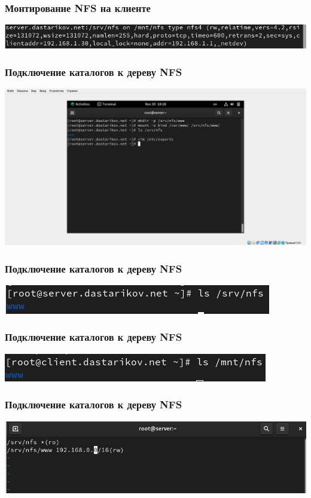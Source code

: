 \begin{frame}
\frametitle{Монтирование NFS на клиенте}
    \includegraphics[width=\textwidth]{../images/image11.png}
\end{frame}


\begin{frame}
\frametitle{Подключение каталогов к дереву NFS}
    \includegraphics[width=\textwidth]{../images/image15.png}
\end{frame}

\begin{frame}
\frametitle{Подключение каталогов к дереву NFS}
    \includegraphics[width=\textwidth]{../images/image12.png}
\end{frame}

\begin{frame}
\frametitle{Подключение каталогов к дереву NFS}
    \includegraphics[width=\textwidth]{../images/image13.png}
\end{frame}

\begin{frame}
\frametitle{Подключение каталогов к дереву NFS}
    \includegraphics[width=\textwidth]{../images/image14.png}
\end{frame}

